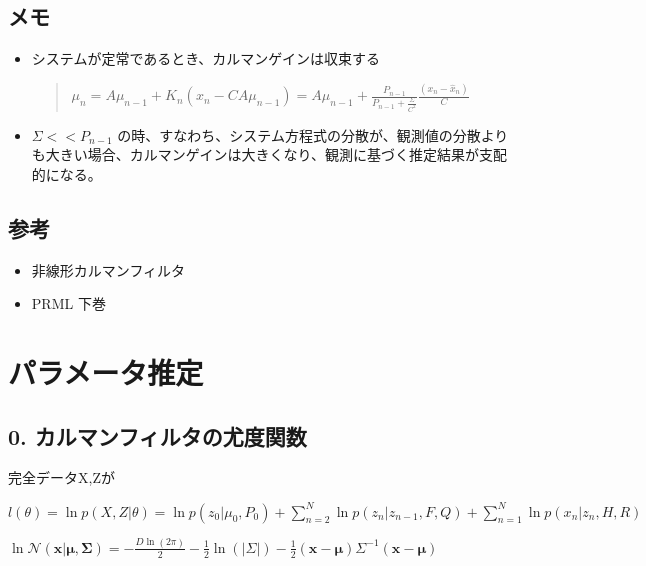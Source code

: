 \documentclass[letterpaper,10pt,dvipdfmx]{sphinxmanual}
\begin{document}
\section{メモ}
\label{docs/about_kalman:id9}\begin{itemize}
\item {} 
システムが定常であるとき、カルマンゲインは収束する
\begin{quote}

\(\mu_{n}=A\mu_{n-1}+K_{n}(x_{n}-CA\mu_{n-1})= A\mu_{n-1}+\frac{P_{n-1}}{P_{n-1}+\frac{\Sigma}{C^2}}\frac{(x_{n}-\hat{x}_{n})}{C}\)
\end{quote}

\item {} 
\(\Sigma << P_{n-1}\) の時、すなわち、システム方程式の分散が、観測値の分散よりも大きい場合、カルマンゲインは大きくなり、観測に基づく推定結果が支配的になる。

\end{itemize}


\section{参考}
\label{docs/about_kalman:id10}\begin{itemize}
\item {} 
非線形カルマンフィルタ

\item {} 
PRML 下巻

\end{itemize}


\chapter{パラメータ推定}
\label{docs/estimate_parameter::doc}\label{docs/estimate_parameter:id1}

\section{0. カルマンフィルタの尤度関数}
\label{docs/estimate_parameter:id2}
完全データX,Zが

\(l(\theta) = \ln p(X,Z|\theta) = \ln p(z_{0}|\mu_{0},P_{0})+ \sum_{n=2}^{N} \ln p(z_{n}|z_{n-1},F,Q)+ \sum_{n=1}^{N} \ln p(x_{n}|z_{n},H,R)\)

\(\ln \mathcal{N} (\mathbf{x}|\mathbf{\mu},\mathbf{\Sigma}) = - \frac{D\ln(2 \pi)}{2}  -\frac{1}{2} \ln(|\Sigma|) -\frac{1}{2}(\mathbf{x}- \mathbf{\mu}) \Sigma^{-1}(\mathbf{x}- \mathbf{\mu})\)
\end{document}
